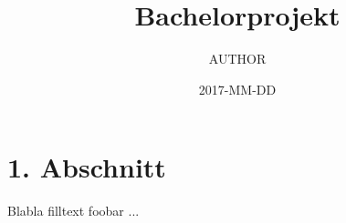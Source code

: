\documentclass[a4paper,10pt]{article}
\title{Bachelorprojekt}
\date{2017-MM-DD}
\author{AUTHOR}
\begin{document}

  \newpage

  \tableofcontents
  \newpage


  \section{1. Abschnitt}
  
  
  
  
  Blabla filltext foobar \cite{wikipedia:foobar}... \\
  
\end{document}

